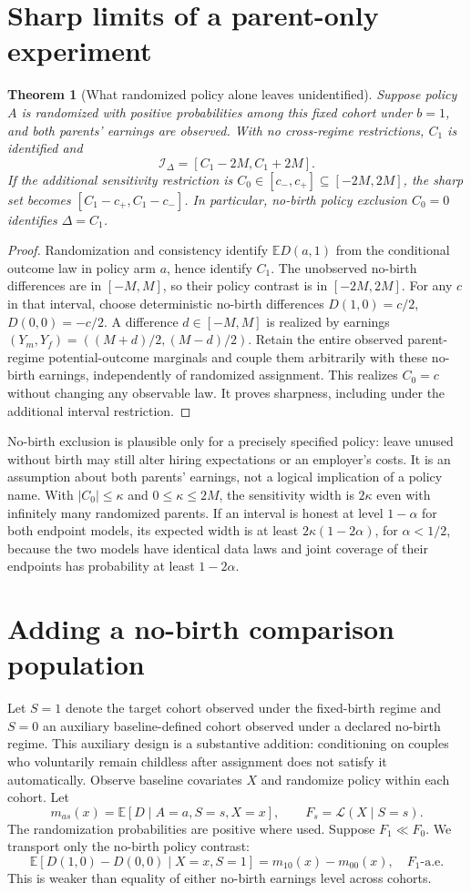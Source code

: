 \documentclass[11pt]{article}
\newtheorem{theorem}{Theorem}
\theoremstyle{remark}\newtheorem{remark}[theorem]{Remark}
\newcommand{\E}{\mathbb E}
\begin{document}
\section{Sharp limits of a parent-only experiment}
\begin{theorem}[What randomized policy alone leaves unidentified]\label{bounds}
Suppose policy $A$ is randomized with positive probabilities among this fixed cohort under $b=1$, and both parents' earnings are observed. With no cross-regime restrictions, $C_1$ is identified and
\[
 \mathcal I_\Delta=[C_1-2M,C_1+2M].
\]
If the additional sensitivity restriction is $C_0\in[c_-,c_+]\subseteq[-2M,2M]$, the sharp set becomes
$[C_1-c_+,C_1-c_-]$. In particular, no-birth policy exclusion $C_0=0$ identifies $\Delta=C_1$.
\end{theorem}
\begin{proof}
Randomization and consistency identify $\E D(a,1)$ from the conditional outcome law in policy arm $a$, hence identify $C_1$. The unobserved no-birth differences are in $[-M,M]$, so their policy contrast is in $[-2M,2M]$. For any $c$ in that interval, choose deterministic no-birth differences $D(1,0)=c/2$, $D(0,0)=-c/2$. A difference $d\in[-M,M]$ is realized by earnings $(Y_m,Y_f)=((M+d)/2,(M-d)/2)$. Retain the entire observed parent-regime potential-outcome marginals and couple them arbitrarily with these no-birth earnings, independently of randomized assignment. This realizes $C_0=c$ without changing any observable law. It proves sharpness, including under the additional interval restriction.
\end{proof}

No-birth exclusion is plausible only for a precisely specified policy: leave unused without birth may still alter hiring expectations or an employer's costs. It is an assumption about both parents' earnings, not a logical implication of a policy name. With $|C_0|\leq\kappa$ and $0\leq\kappa\leq2M$, the sensitivity width is $2\kappa$ even with infinitely many randomized parents. If an interval is honest at level $1-\alpha$ for both endpoint models, its expected width is at least $2\kappa(1-2\alpha)$, for $\alpha<1/2$, because the two models have identical data laws and joint coverage of their endpoints has probability at least $1-2\alpha$.

\section{Adding a no-birth comparison population}
Let $S=1$ denote the target cohort observed under the fixed-birth regime and $S=0$ an auxiliary baseline-defined cohort observed under a declared no-birth regime. This auxiliary design is a substantive addition: conditioning on couples who voluntarily remain childless after assignment does not satisfy it automatically. Observe baseline covariates $X$ and randomize policy within each cohort. Let
\[
 m_{as}(x)=\E[D\mid A=a,S=s,X=x],\qquad
 F_s=\mathcal L(X\mid S=s).
\]
The randomization probabilities are positive where used. Suppose $F_1\ll F_0$. We transport only the no-birth policy contrast:
\[
 \E[D(1,0)-D(0,0)\mid X=x,S=1]
       =m_{10}(x)-m_{00}(x),\quad F_1\text{-a.e.}
 \tag{T}
\]
This is weaker than equality of either no-birth earnings level across cohorts.
\end{document}
